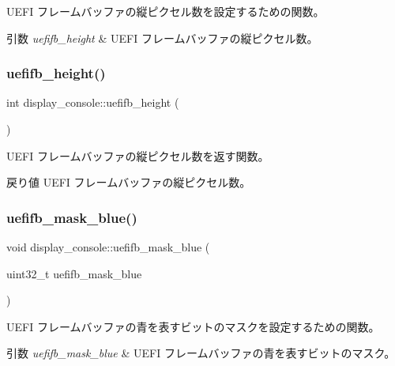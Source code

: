 U\+E\+FI フレームバッファの縦ピクセル数を設定するための関数。 
\begin{DoxyParams}{引数}
{\em uefifb\+\_\+height} & U\+E\+FI フレームバッファの縦ピクセル数。 \\
\hline
\end{DoxyParams}
\hypertarget{classdisplay__console_afec1cad7f92d03a020a4a2140bcd3ee9}{}\label{classdisplay__console_afec1cad7f92d03a020a4a2140bcd3ee9} 
\subsubsection{\texorpdfstring{uefifb\+\_\+height()}{uefifb\_height()}\hspace{0.1cm}{\footnotesize\ttfamily [2/2]}}
{\footnotesize\ttfamily int display\+\_\+console\+::uefifb\+\_\+height (\begin{DoxyParamCaption}{ }\end{DoxyParamCaption})}

U\+E\+FI フレームバッファの縦ピクセル数を返す関数。 \begin{DoxyReturn}{戻り値}
U\+E\+FI フレームバッファの縦ピクセル数。 
\end{DoxyReturn}
\hypertarget{classdisplay__console_a64a0fe72df84541a22009e5abc2619bc}{}\label{classdisplay__console_a64a0fe72df84541a22009e5abc2619bc} 
\subsubsection{\texorpdfstring{uefifb\+\_\+mask\+\_\+blue()}{uefifb\_mask\_blue()}\hspace{0.1cm}{\footnotesize\ttfamily [1/2]}}
{\footnotesize\ttfamily void display\+\_\+console\+::uefifb\+\_\+mask\+\_\+blue (\begin{DoxyParamCaption}\item[{uint32\+\_\+t}]{uefifb\+\_\+mask\+\_\+blue }\end{DoxyParamCaption})}

U\+E\+FI フレームバッファの青を表すビットのマスクを設定するための関数。 
\begin{DoxyParams}{引数}
{\em uefifb\+\_\+mask\+\_\+blue} & U\+E\+FI フレームバッファの青を表すビットのマスク。 \\
\hline
\end{DoxyParams}
\hypertarget{classdisplay__console_a0a8c7d6ade4cf363f29f404ab3749290}{}\label{classdisplay__console_a0a8c7d6ade4cf363f29f404ab3749290} 
